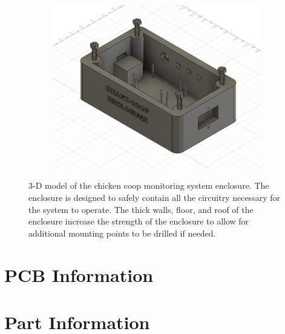 \documentclass{article}
\begin{document}
\begin{figure}[H]
\begin{subfigure}[b]{0.45\textwidth}
        \includegraphics[width=\linewidth]{fig/enclosure-3.png}
        \caption[]%
        {}
    \end{subfigure} 
    \hfill
    \caption{3-D model of the chicken coop monitoring system enclosure. The enclosure is designed to safely contain all the circuitry necessary for the system to operate.  The thick walls, floor, and roof of the enclosure increase the strength of the enclosure to allow for additional mounting points to be drilled if needed.} 
    \label{fig:enclosure-model}
\end{figure}


\section{PCB Information}
\section{Part Information}
\end{document}
